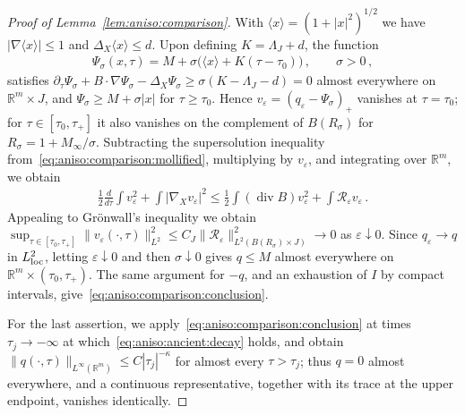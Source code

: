 \documentclass[11pt,reqno]{amsproc}
\numberwithin{equation}{section}
\theoremstyle{remark}
\newcommand{\p}{\partial}
\newcommand{\RR}{\mathbb R}
\newcommand{\eps}{\varepsilon}
\renewcommand{\div}{\operatorname{div}}
\begin{document}
\begin{proof}[Proof of Lemma~\ref{lem:aniso:comparison}]
With $\langle x\rangle=(1+|x|^2)^{1/2}$ we have $|\nabla\langle x\rangle|\le1$ and $\Delta_X\langle x\rangle\le d$. Upon defining $K=\Lambda_J+d$, the function
\begin{align}
\Psi_\sigma(x,\tau)
=M+\sigma\big(\langle x\rangle+K(\tau-\tau_0)\big)
\,,\qquad\sigma>0
\,,
\label{eq:aniso:comparison:barrier}
\end{align}
satisfies $\p_\tau\Psi_\sigma+B\cdot\nabla\Psi_\sigma-\Delta_X\Psi_\sigma\ge\sigma(K-\Lambda_J-d)=0$ almost everywhere on $\RR^m\times J$, and $\Psi_\sigma\ge M+\sigma|x|$ for $\tau\ge\tau_0$. Hence $v_\eps=(q_\eps-\Psi_\sigma)_+$ vanishes at $\tau=\tau_0$; for $\tau\in[\tau_0,\tau_+]$ it also vanishes on the complement of $B(R_\sigma)$ for $R_\sigma=1+M_\infty/\sigma$. Subtracting the supersolution inequality from~\eqref{eq:aniso:comparison:mollified}, multiplying by $v_\eps$, and integrating over $\RR^m$, we obtain
\begin{align}
\frac12\frac{d}{d\tau}\int v_\eps^2
+\int|\nabla_Xv_\eps|^2
\le\frac12\int(\div B)v_\eps^2
+\int\mathcal R_\eps v_\eps
\,.
\label{eq:aniso:comparison:positive:energy}
\end{align}
Appealing to Gr\"onwall's inequality we obtain $\sup_{\tau\in[\tau_0,\tau_+]}\|v_\eps(\cdot,\tau)\|_{L^2}^2\le C_J\|\mathcal R_\eps\|_{L^2(B(R_\sigma)\times J)}^2\to0$ as $\eps\downarrow0$. Since $q_\eps\to q$ in $L^2_{\rm loc}$, letting $\eps\downarrow0$ and then $\sigma\downarrow0$ gives $q\le M$ almost everywhere on $\RR^m\times(\tau_0,\tau_+)$. The same argument for $-q$, and an exhaustion of $I$ by compact intervals, give~\eqref{eq:aniso:comparison:conclusion}.

For the last assertion, we apply~\eqref{eq:aniso:comparison:conclusion} at times $\tau_j\to-\infty$ at which~\eqref{eq:aniso:ancient:decay} holds, and obtain $\|q(\cdot,\tau)\|_{L^\infty(\RR^m)}\le C|\tau_j|^{-\kappa}$ for almost every $\tau>\tau_j$; thus $q=0$ almost everywhere, and a continuous representative, together with its trace at the upper endpoint, vanishes identically.
\end{proof}
\end{document}
